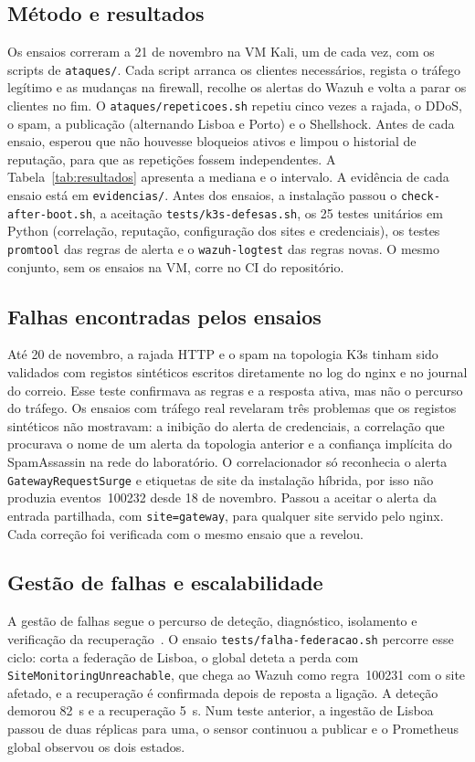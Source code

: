 \documentclass[conference,a4paper]{IEEEtran}
\newcommand{\code}[1]{\texttt{\small #1}}
\begin{document}
\subsection{Método e resultados}
Os ensaios correram a 21 de novembro na VM Kali, um de cada vez, com os scripts de \code{ataques/}. Cada script arranca os clientes necessários, regista o tráfego legítimo e as mudanças na firewall, recolhe os alertas do Wazuh e volta a parar os clientes no fim. O \code{ataques/repeticoes.sh} repetiu cinco vezes a rajada, o DDoS, o spam, a publicação (alternando Lisboa e Porto) e o Shellshock. Antes de cada ensaio, esperou que não houvesse bloqueios ativos e limpou o historial de reputação, para que as repetições fossem independentes. A Tabela~\ref{tab:resultados} apresenta a mediana e o intervalo. A evidência de cada ensaio está em \code{evidencias/}. Antes dos ensaios, a instalação passou o \code{check-after-boot.sh}, a aceitação \code{tests/k3s-defesas.sh}, os 25 testes unitários em Python (correlação, reputação, configuração dos sites e credenciais), os testes \code{promtool} das regras de alerta e o \code{wazuh-logtest} das regras novas. O mesmo conjunto, sem os ensaios na VM, corre no CI do repositório.

\subsection{Falhas encontradas pelos ensaios}
Até 20 de novembro, a rajada HTTP e o spam na topologia K3s tinham sido validados com registos sintéticos escritos diretamente no log do nginx e no journal do correio. Esse teste confirmava as regras e a resposta ativa, mas não o percurso do tráfego. Os ensaios com tráfego real revelaram três problemas que os registos sintéticos não mostravam: a inibição do alerta de credenciais, a correlação que procurava o nome de um alerta da topologia anterior e a confiança implícita do SpamAssassin na rede do laboratório. O correlacionador só reconhecia o alerta \code{GatewayRequestSurge} e etiquetas de site da instalação híbrida, por isso não produzia eventos~100232 desde 18 de novembro. Passou a aceitar o alerta da entrada partilhada, com \code{site=gateway}, para qualquer site servido pelo nginx. Cada correção foi verificada com o mesmo ensaio que a revelou.

\subsection{Gestão de falhas e escalabilidade}
A gestão de falhas segue o percurso de deteção, diagnóstico, isolamento e verificação da recuperação~\cite{m3400}. O ensaio \code{tests/falha-federacao.sh} percorre esse ciclo: corta a federação de Lisboa, o global deteta a perda com \code{SiteMonitoringUnreachable}, que chega ao Wazuh como regra~100231 com o site afetado, e a recuperação é confirmada depois de reposta a ligação. A deteção demorou 82~s e a recuperação 5~s. Num teste anterior, a ingestão de Lisboa passou de duas réplicas para uma, o sensor continuou a publicar e o Prometheus global observou os dois estados.
\end{document}
